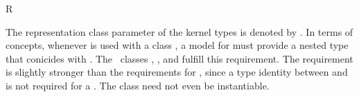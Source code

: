 \begin{ccRefConcept}{R}

The representation class parameter of the kernel types is denoted by .
In terms of concepts, whenever  is used with a class 
, a model for  must provide a nested type 
 that conicides with . 
The \cgal\ classes , ,
 and  fulfill this requirement.
The requirement is slightly 
stronger than the requirements for , since a type identity between 
 and  is not 
required for a . The class  need 
not even be instantiable.

\ccTypes

\ccGlue
{}

\ccHasModels
{}  \\
 \\
 \\
 \\


\end{ccRefConcept}

